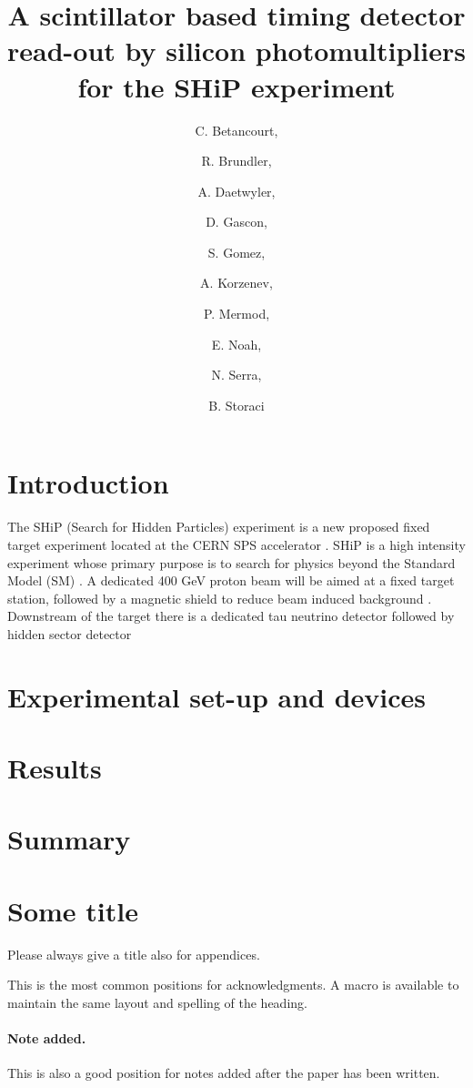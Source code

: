 \documentclass[a4paper,11pt]{article}
\title{A scintillator based timing detector read-out by silicon photomultipliers for the SHiP experiment}
\author[a,1]{C. Betancourt,\note{Corresponding author.}}
\author[a]{R. Brundler,}
\author[a]{A. Daetwyler,}
\author[b]{D. Gascon,}
\author[b]{S. Gomez,}
\author[c]{A. Korzenev,}
\author[c]{P. Mermod,}
\author[c]{E. Noah,}
\author[a]{N. Serra,}
\author[a]{B. Storaci}
\affiliation[a]{Universit\"{a}t Z\"{u}rich}
\affiliation[b]{Universitat de Barcelona}
\affiliation[c]{Universit\'{e} de Gen\`{e}ve}
\begin{document}
\maketitle
\flushbottom

\section{Introduction}
\label{sec:intro}

The SHiP (Search for Hidden Particles) experiment is a new proposed fixed target experiment located at the CERN SPS accelerator \cite{a}. SHiP is a high intensity experiment whose primary purpose is to search for physics beyond the Standard Model (SM) \cite{b}. A dedicated 400 GeV proton beam will be aimed at a fixed target station, followed by a magnetic shield to reduce beam induced background \cite{c}. Downstream of the target there is a dedicated tau neutrino detector followed by hidden sector detector

\section{Experimental set-up and devices}
\label{sec:setup}

\section{Results}
\label{sec:results}

\section{Summary}
\label{summary}

\appendix
\section{Some title}
Please always give a title also for appendices.





\acknowledgments

This is the most common positions for acknowledgments. A macro is
available to maintain the same layout and spelling of the heading.

\paragraph{Note added.} This is also a good position for notes added
after the paper has been written.
\end{document}

